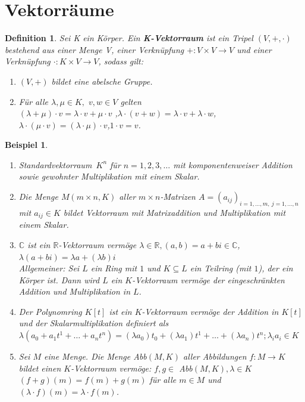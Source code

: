 \documentclass[12pt,a4paper]{article}
\theoremstyle{plain}
\newtheorem{Definition}[Theorem]{Definition}
\newtheorem{Beispiel}[Theorem]{Beispiel}
\newcommand{\herv}[1]{{\emph{\textbf{#1}}}}
\newcommand{\R}{\mathbb{R}}
\newcommand{\C}{\mathbb{C}}
\numberwithin{equation}{section}
\begin{document}
\section{Vektorräume}
\begin{Definition}
Sei K ein Körper. Ein \herv{K-Vektorraum} ist ein Tripel $(V,+,\cdot)$ bestehend aus einer Menge V, einer Verknüpfung $+:V\times V \rightarrow V$ und einer Verknüpfung $\cdot : K\times V \rightarrow V$, sodass gilt:
\begin{enumerate}
\renewcommand{\labelenumi}{\emph{\underline{V\arabic{enumi}}}}
\item $(V,+)$ bildet eine abelsche Gruppe.
\item Für alle $\lambda, \mu \in K,$  $ v,w\in V$ gelten \\
$(\lambda+\mu)\cdot v=\lambda \cdot v+ \mu\cdot v$ ,\quad $\lambda\cdot (v+w)=\lambda\cdot v+ \lambda \cdot w$,\quad $\lambda\cdot (\mu\cdot v)=(\lambda\cdot\mu)\cdot v$,\quad $1\cdot v=v$.
\end{enumerate}
\end{Definition}
\begin{Beispiel}
\begin{enumerate}
\renewcommand{\labelenumi}{\alph{enumi})}
\item \glqq Standardvektorraum\grqq\ $K^n$ für $n=1,2,3,\ldots$ mit komponentenweiser Addition sowie gewohnter Multiplikation mit einem Skalar.
\item Die Menge $M(m\times n,K)$ aller $m\times n$-Matrizen $A=(a_{ij})_{i=1,\ldots,m,\ j=1,\ldots,n}$ mit $a_{ij}\in K$ bildet Vektorraum mit Matrixaddition und Multiplikation mit einem Skalar.
\item $\C$ ist ein $\R$-Vektorraum vermöge $\lambda\in\R, (a,b)=a+bi\in\C$, $\lambda(a+bi)=\lambda a+(\lambda b) i$\\
Allgemeiner: Sei $L$ ein Ring mit $1$ und $K\subseteq L$ ein Teilring (mit $1$), der ein Körper ist. Dann wird $L$ ein $K$-Vektorraum vermöge der eingeschränkten Addition und Multiplikation in $L$.
\item Der Polynomring $K[t]$ ist ein $K$-Vektorraum vermöge der Addition in $K[t]$ und der Skalarmultiplikation definiert als $\lambda(a_0+a_1t^1+\ldots+a_nt^n)=(\lambda a_0)t_0+(\lambda a_1)t^1+\ldots+(\lambda a_n)t^n; \lambda_ia_i \in K$
\item  Sei $M$ eine Menge. Die Menge Abb$(M,K)$ aller Abbildungen $f:M\rightarrow K$ bildet einen $K$-Vektorraum vermöge: $f,g\in$ Abb$(M,K),\lambda\in K$ $(f+g)(m)=f(m)+g(m)$ für alle $m\in M$ und $(\lambda\cdot f)(m)=\lambda\cdot f(m)$.
\end{enumerate}
\end{Beispiel}
\end{document}
